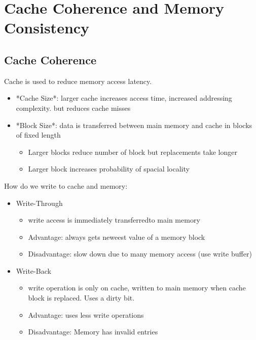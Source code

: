 \documentclass{article}
\begin{document}
\section{Cache Coherence and Memory Consistency}
\subsection{Cache Coherence}
Cache is used to reduce memory access latency.

\begin{itemize}
    \item *Cache Size*: larger cache increases access time, increased addressing complexity. but reduces cache misses
    \item *Block Size*: data is transferred between main memory and cache in blocks of fixed length
          \begin{itemize}
              \item Larger blocks reduce number of block but replacements take longer
              \item Larger block increases probability of spacial locality
          \end{itemize}
\end{itemize}

How do we write to cache and memory:
\begin{itemize}
    \item Write-Through
          \begin{itemize}
              \item write access is immediately transferredto main memory
              \item Advantage: always gets neweest value of a memory block
              \item Disadvantage: slow down due to many memory access (use write buffer)
          \end{itemize}
    \item Write-Back
          \begin{itemize}
              \item write operation is only on cache, written to main memory when cache block is replaced. Uses a dirty bit.
              \item Advantage: uses less write operations
              \item Disadvantage: Memory has invalid entries
          \end{itemize}
\end{itemize}
\end{document}
